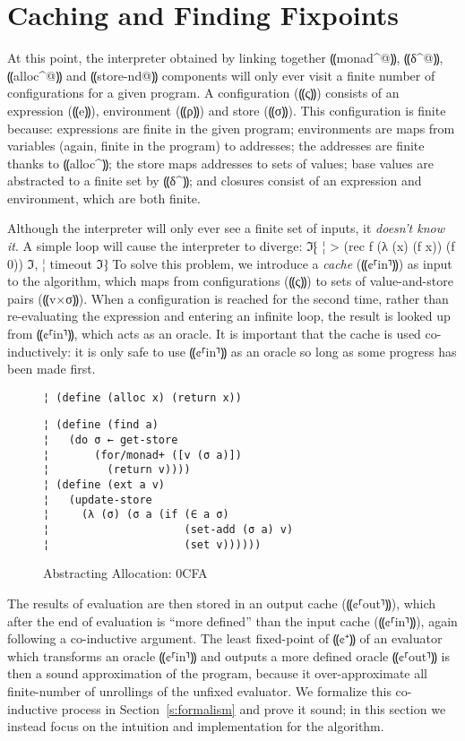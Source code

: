 \section{Caching and Finding Fixpoints}\label{s:cache}

At this point, the interpreter obtained by linking together ⸨monad^@⸩, ⸨δ^@⸩,
⸨alloc^@⸩ and ⸨store-nd@⸩ components will only ever visit a finite number of
configurations for a given program. A configuration (⸨ς⸩) consists of an
expression (⸨e⸩), environment (⸨ρ⸩) and store (⸨σ⸩). This configuration is
finite because: expressions are finite in the given program; environments are
maps from variables (again, finite in the program) to addresses; the addresses
are finite thanks to ⸨alloc^⸩; the store maps addresses to sets of values; base
values are abstracted to a finite set by ⸨δ^⸩; and closures consist of an
expression and environment, which are both finite.

Although the interpreter will only ever see a finite set of inputs, it
\emph{doesn't know it}.  A simple loop will cause the interpreter to diverge:
ℑ⁅
¦ > (rec f (λ (x) (f x)) (f 0))
ℑ,
¦ timeout
ℑ⁆
To solve this problem, we introduce a \emph{cache} (⸨¢⸢in⸣⸩) as input to the
algorithm, which maps from configurations (⸨ς⸩) to sets of value-and-store
pairs (⸨v×σ⸩). When a configuration is reached for the second time, rather than
re-evaluating the expression and entering an infinite loop, the result is
looked up from ⸨¢⸢in⸣⸩, which acts as an oracle. It is important that the cache
is used co-inductively: it is only safe to use ⸨¢⸢in⸣⸩ as an oracle so long as
some progress has been made first. 

\begin{figure} %
\begin{lstlisting}
¦ (define (alloc x) (return x))
\end{lstlisting}
\figskip{}
\begin{lstlisting}
¦ (define (find a)
¦   (do σ ← get-store
¦       (for/monad+ ([v (σ a)])
¦         (return v))))
¦ (define (ext a v)
¦   (update-store
¦     (λ (σ) (σ a (if (∈ a σ) 
¦                     (set-add (σ a) v) 
¦                     (set v))))))
\end{lstlisting}
\vspace{-0.75em}
\caption{Abstracting Allocation: 0CFA}
\label{f:0cfa-abs}
\vspace{-1em}
\end{figure} %

The results of evaluation are then stored in an output cache (⸨¢⸢out⸣⸩), which
after the end of evaluation is “more defined” than the input cache (⸨¢⸢in⸣⸩),
again following a co-inductive argument. The least fixed-point of ⸨¢⁺⸩ of an
evaluator which transforms an oracle ⸨¢⸢in⸣⸩ and outputs a more defined oracle
⸨¢⸢out⸣⸩ is then a sound approximation of the program, because it
over-approximate all finite-number of unrollings of the unfixed evaluator. We
formalize this co-inductive process in Section~\ref{s:formalism} and prove it
sound; in this section we instead focus on the intuition and implementation for
the algorithm.

